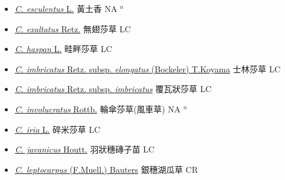 \begin{itemize}
\begin{itemize}
        \item[] \href{http://www.theplantlist.org/tpl1.1/search?q=Cyperus+esculentus}{\textit{C. esculentus} L.}   黃土香 NA $^n$
        \item[] \href{http://www.theplantlist.org/tpl1.1/search?q=Cyperus+exaltatus}{\textit{C. exaltatus} Retz.}   無翅莎草 LC
        \item[] \href{http://www.theplantlist.org/tpl1.1/search?q=Cyperus+haspan}{\textit{C. haspan} L.}   畦畔莎草 LC
        \item[] \href{http://www.theplantlist.org/tpl1.1/search?q=Cyperus+imbricatus+subsp.+elongatus}{\textit{C. imbricatus} Retz. subsp. \textit{elongatus} (Bockeler) T.Koyama}   士林莎草 LC
        \item[] \href{http://www.theplantlist.org/tpl1.1/search?q=Cyperus+imbricatus+subsp.+imbricatus}{\textit{C. imbricatus} Retz. subsp. \textit{imbricatus}}   覆瓦狀莎草 LC
        \item[] \href{http://www.theplantlist.org/tpl1.1/search?q=Cyperus+involucratus}{\textit{C. involucratus} Rottb.}     輪傘莎草(風車草)   NA $^n$
        \item[] \href{http://www.theplantlist.org/tpl1.1/search?q=Cyperus+iria}{\textit{C. iria} L.}   碎米莎草 LC
        \item[] \href{http://www.theplantlist.org/tpl1.1/search?q=Cyperus+javanicus}{\textit{C. javanicus} Houtt.}     羽狀穗磚子苗 LC
        \item[] \href{http://www.theplantlist.org/tpl1.1/search?q=Cyperus+leptocarpus}{\textit{C. leptocarpus} (F.Muell.) Bauters}     銀穗湖瓜草 CR

\end{itemize}
\end{itemize}
